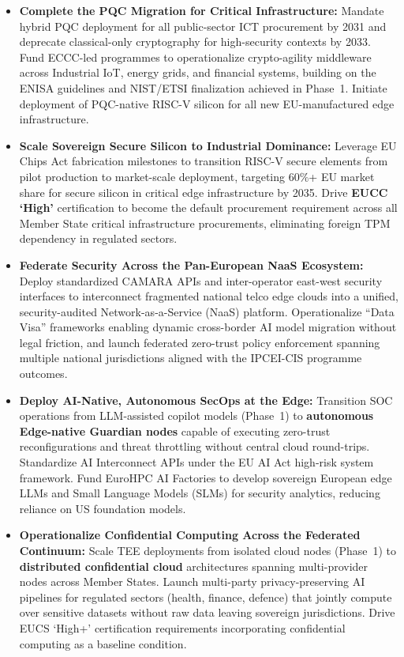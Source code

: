 \documentclass{ieeeaccess}
\begin{document}
\begin{itemize}
    \item \textbf{Complete the PQC Migration for Critical Infrastructure:}
    Mandate hybrid PQC deployment for all public-sector ICT procurement by 2031 and
    deprecate classical-only cryptography for high-security contexts by 2033. Fund ECCC-led
    programmes to operationalize crypto-agility middleware across Industrial IoT, energy
    grids, and financial systems, building on the ENISA guidelines and NIST/ETSI
    finalization achieved in Phase~1. Initiate deployment of PQC-native RISC-V silicon for
    all new EU-manufactured edge infrastructure.

    \item \textbf{Scale Sovereign Secure Silicon to Industrial Dominance:}
    Leverage EU Chips Act fabrication milestones to transition RISC-V secure elements from
    pilot production to market-scale deployment, targeting 60\%+ EU market share for secure
    silicon in critical edge infrastructure by 2035. Drive \textbf{EUCC `High'} certification
    to become the default procurement requirement across all Member State critical
    infrastructure procurements, eliminating foreign TPM dependency in regulated sectors.

    \item \textbf{Federate Security Across the Pan-European NaaS Ecosystem:}
    Deploy standardized CAMARA APIs and inter-operator east-west security interfaces to
    interconnect fragmented national telco edge clouds into a unified, security-audited
    Network-as-a-Service (NaaS) platform. Operationalize ``Data Visa'' frameworks enabling
    dynamic cross-border AI model migration without legal friction, and launch federated
    zero-trust policy enforcement spanning multiple national jurisdictions aligned with the
    IPCEI-CIS programme outcomes.

    \item \textbf{Deploy AI-Native, Autonomous SecOps at the Edge:}
    Transition SOC operations from LLM-assisted copilot models (Phase~1) to
    \textbf{autonomous Edge-native Guardian nodes} capable of executing zero-trust
    reconfigurations and threat throttling without central cloud round-trips. Standardize
    AI Interconnect APIs under the EU AI Act high-risk system framework. Fund EuroHPC AI
    Factories to develop sovereign European edge LLMs and Small Language Models (SLMs) for
    security analytics, reducing reliance on US foundation models.

    \item \textbf{Operationalize Confidential Computing Across the Federated Continuum:}
    Scale TEE deployments from isolated cloud nodes (Phase~1) to \textbf{distributed
    confidential cloud} architectures spanning multi-provider nodes across Member States.
    Launch multi-party privacy-preserving AI pipelines for regulated sectors (health, finance,
    defence) that jointly compute over sensitive datasets without raw data leaving sovereign
    jurisdictions. Drive EUCS `High+' certification requirements incorporating confidential
    computing as a baseline condition.


\end{itemize}
\end{document}

